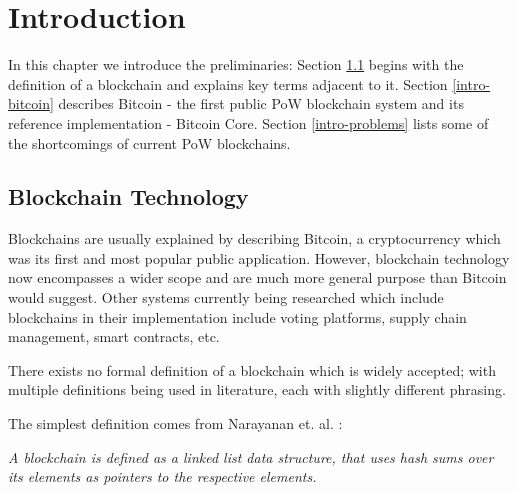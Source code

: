 \chapter{Introduction} \label{ch-intro}

In this chapter we introduce the preliminaries:
Section \ref{intro-blockchain} begins with the definition of a blockchain and explains key terms adjacent to it.
Section \ref{intro-bitcoin} describes Bitcoin - the first public PoW blockchain system and its reference implementation - Bitcoin Core. 
Section \ref{intro-problems} lists some of the shortcomings of current PoW blockchains. 


\section{Blockchain Technology} \label{intro-blockchain}


Blockchains are usually explained by describing Bitcoin, a cryptocurrency which was its first and most popular public application. 
However, blockchain technology now encompasses a wider scope and are much more general purpose than Bitcoin would suggest. 
Other systems currently being researched which include blockchains in their implementation include voting platforms, supply chain management, smart contracts, etc.


There exists no formal definition of a blockchain which is widely accepted; with multiple definitions being used in literature, each with slightly different phrasing. 

The simplest definition comes from Narayanan et. al. \cite{bitcoinBook}: 

\textit{
    A blockchain is defined as a linked list data structure, that uses hash sums over its elements as pointers to the respective elements.
}

